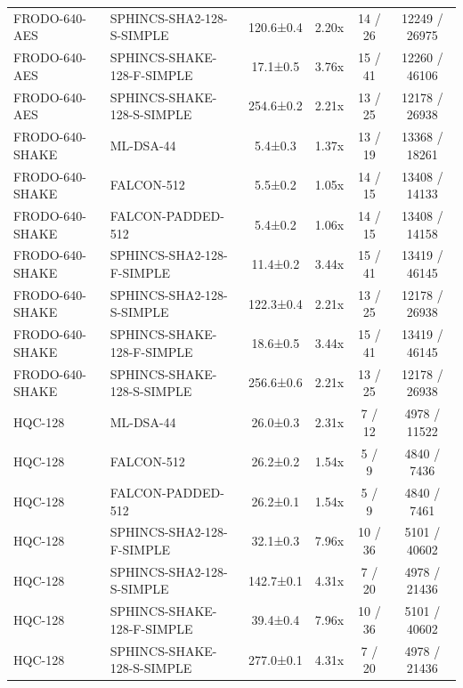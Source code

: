 \documentclass[10pt]{article}
\begin{document}
\begin{tabular}{@{}l l c c c c@{}}
FRODO-640-AES & SPHINCS-SHA2-128-S-SIMPLE & 120.6±0.4 & 2.20x & 14 / 26 & 12249 / 26975 \\
FRODO-640-AES & SPHINCS-SHAKE-128-F-SIMPLE & 17.1±0.5 & 3.76x & 15 / 41 & 12260 / 46106 \\
FRODO-640-AES & SPHINCS-SHAKE-128-S-SIMPLE & 254.6±0.2 & 2.21x & 13 / 25 & 12178 / 26938 \\
FRODO-640-SHAKE & ML-DSA-44 & 5.4±0.3 & 1.37x & 13 / 19 & 13368 / 18261 \\
FRODO-640-SHAKE & FALCON-512 & 5.5±0.2 & 1.05x & 14 / 15 & 13408 / 14133 \\
FRODO-640-SHAKE & FALCON-PADDED-512 & 5.4±0.2 & 1.06x & 14 / 15 & 13408 / 14158 \\
FRODO-640-SHAKE & SPHINCS-SHA2-128-F-SIMPLE & 11.4±0.2 & 3.44x & 15 / 41 & 13419 / 46145 \\
FRODO-640-SHAKE & SPHINCS-SHA2-128-S-SIMPLE & 122.3±0.4 & 2.21x & 13 / 25 & 12178 / 26938 \\
FRODO-640-SHAKE & SPHINCS-SHAKE-128-F-SIMPLE & 18.6±0.5 & 3.44x & 15 / 41 & 13419 / 46145 \\
FRODO-640-SHAKE & SPHINCS-SHAKE-128-S-SIMPLE & 256.6±0.6 & 2.21x & 13 / 25 & 12178 / 26938 \\
HQC-128 & ML-DSA-44 & 26.0±0.3 & 2.31x & 7 / 12 & 4978 / 11522 \\
HQC-128 & FALCON-512 & 26.2±0.2 & 1.54x & 5 / 9 & 4840 / 7436 \\
HQC-128 & FALCON-PADDED-512 & 26.2±0.1 & 1.54x & 5 / 9 & 4840 / 7461 \\
HQC-128 & SPHINCS-SHA2-128-F-SIMPLE & 32.1±0.3 & 7.96x & 10 / 36 & 5101 / 40602 \\
HQC-128 & SPHINCS-SHA2-128-S-SIMPLE & 142.7±0.1 & 4.31x & 7 / 20 & 4978 / 21436 \\
HQC-128 & SPHINCS-SHAKE-128-F-SIMPLE & 39.4±0.4 & 7.96x & 10 / 36 & 5101 / 40602 \\
HQC-128 & SPHINCS-SHAKE-128-S-SIMPLE & 277.0±0.1 & 4.31x & 7 / 20 & 4978 / 21436 \\
\bottomrule
\end{tabular}
\end{document}
